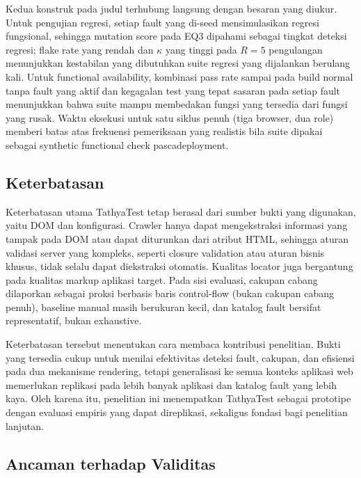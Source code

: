 \documentclass[conference]{IEEEtran}
\begin{document}
Kedua konstruk pada judul terhubung langsung dengan besaran yang diukur. Untuk pengujian regresi, setiap fault yang di-seed mensimulasikan regresi fungsional, sehingga mutation score pada EQ3 dipahami sebagai tingkat deteksi regresi; flake rate yang rendah dan $\kappa$ yang tinggi pada $R=5$ pengulangan menunjukkan kestabilan yang dibutuhkan suite regresi yang dijalankan berulang kali. Untuk functional availability, kombinasi pass rate \evBladePassRate{} sampai \evInertiaPassRate{} pada build normal tanpa fault yang aktif dan kegagalan test yang tepat sasaran pada setiap fault menunjukkan bahwa suite mampu membedakan fungsi yang tersedia dari fungsi yang rusak. Waktu eksekusi \evBladeExecSec{} untuk satu siklus penuh (tiga browser, dua role) memberi batas atas frekuensi pemeriksaan yang realistis bila suite dipakai sebagai synthetic functional check pascadeployment.

\subsection{Keterbatasan}

Keterbatasan utama TathyaTest tetap berasal dari sumber bukti yang digunakan, yaitu DOM dan konfigurasi. Crawler hanya dapat mengekstraksi informasi yang tampak pada DOM atau dapat diturunkan dari atribut HTML, sehingga aturan validasi server yang kompleks, seperti closure validation atau aturan bisnis khusus, tidak selalu dapat diekstraksi otomatis. Kualitas locator juga bergantung pada kualitas markup aplikasi target. Pada sisi evaluasi, cakupan cabang dilaporkan sebagai proksi berbasis baris control-flow (bukan cakupan cabang penuh), baseline manual masih berukuran kecil, dan katalog fault bersifat representatif, bukan exhaustive.

Keterbatasan tersebut menentukan cara membaca kontribusi penelitian. Bukti yang tersedia cukup untuk menilai efektivitas deteksi fault, cakupan, dan efisiensi pada dua mekanisme rendering, tetapi generalisasi ke semua konteks aplikasi web memerlukan replikasi pada lebih banyak aplikasi dan katalog fault yang lebih kaya. Oleh karena itu, penelitian ini menempatkan TathyaTest sebagai prototipe dengan evaluasi empiris yang dapat direplikasi, sekaligus fondasi bagi penelitian lanjutan.

\subsection{Ancaman terhadap Validitas}
\end{document}
